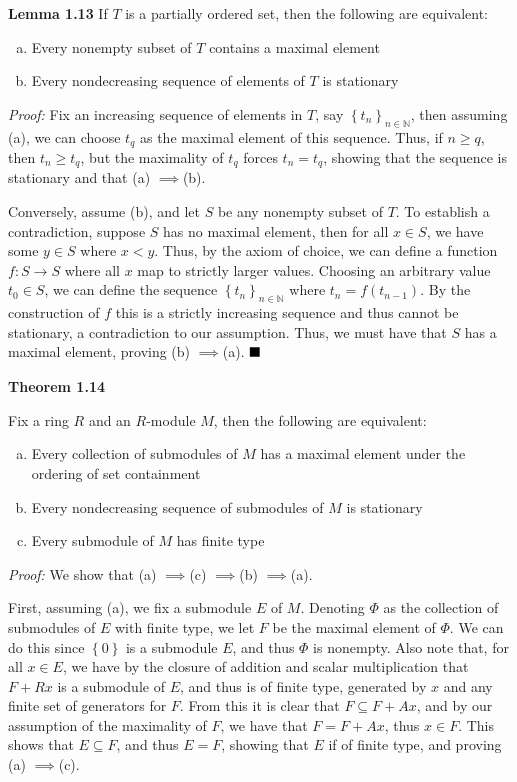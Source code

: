 \documentclass[12pt]{article}
\newcommand{\N}{\ensuremath{\mathbb{N}}}
\newcommand{\braceb}[1]{\left\{#1\right\}}
\newcommand{\proof}{\textit{Proof: }}
\newcommand{\done}{\ensuremath{\strut\hfill\blacksquare}}
\newcommand{\impl}{\ensuremath{\implies}}
\begin{document}
\textbf{Lemma 1.13}
If \( T \) is a partially ordered set, then the following are equivalent:
\begin{enumerate}[(a)]
	\item Every nonempty subset of \( T \) contains a maximal element

	\item Every nondecreasing sequence of elements of \( T \) is stationary
\end{enumerate}

\proof
Fix an increasing sequence of elements in \( T \), say
\( \braceb{t_n}_{n \in \N} \), then assuming (a), we can choose \( t_q \) as
the maximal element of this sequence.
Thus, if \( n \geq q \), then \( t_n \geq t_q \), but the maximality of
\( t_q \) forces \( t_n = t_q \), showing that the sequence is stationary and
that (a) \impl (b).

Conversely, assume (b), and let \( S \) be any nonempty subset of \( T \).
To establish a contradiction, suppose \( S \) has no maximal element, then
for all \( x \in S \), we have some \( y \in S \) where \( x < y \).
Thus, by the axiom of choice, we can define a function \( f : S \to S \) where
all \( x \) map to strictly larger values.
Choosing an arbitrary value \( t_0 \in S \), we can define the sequence
\( \braceb{t_n}_{n \in \N} \) where \( t_n = f(t_{n - 1}) \).
By the construction of \( f \) this is a strictly increasing sequence and thus
cannot be stationary, a contradiction to our assumption.
Thus, we must have that \( S \) has a maximal element, proving (b) \impl (a).
\done

\textbf{Theorem 1.14}

Fix a ring \( R \) and an \( R \)-module \( M \), then the following are
equivalent:
\begin{enumerate}[(a)]
	\item Every collection of submodules of \( M \) has a maximal element
	      under the ordering of set containment

	\item Every nondecreasing sequence of submodules of \( M \) is stationary

	\item Every submodule of \( M \) has finite type
\end{enumerate}

\proof
We show that (a) \impl (c) \impl (b) \impl (a).

First, assuming (a), we fix a submodule \( E \) of \( M \).
Denoting \( \Phi \) as the collection of submodules of \( E \) with finite
type, we let \( F \) be the maximal element of \( \Phi \).
We can do this since \( \braceb{0} \) is a submodule \( E \), and thus
\( \Phi \) is nonempty.
Also note that, for all \( x \in E \), we have by the closure of addition and
scalar multiplication that \( F + Rx \) is a submodule of \( E \), and thus
is of finite type, generated by \( x \) and any finite set of generators for
\( F \).
From this it is clear that \( F \subseteq F + Ax \), and by our assumption of
the maximality of \( F \), we have that \( F = F + Ax \), thus \( x \in F \).
This shows that \( E \subseteq F \), and thus \( E = F \), showing that \( E \)
if of finite type, and proving (a) \impl (c).
\end{document}

